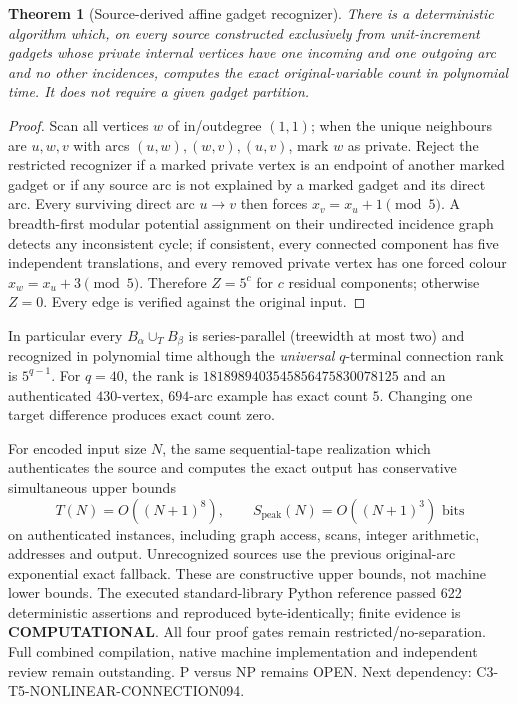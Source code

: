 \documentclass[11pt]{article}
\newtheorem{theorem}{Theorem}
\begin{document}
\begin{theorem}[Source-derived affine gadget recognizer]
There is a deterministic algorithm which, on every source
constructed exclusively from unit-increment gadgets whose
private internal vertices have one incoming and one outgoing
arc and no other incidences, computes the \emph{exact}
original-variable count in polynomial time. It does not
require a given gadget partition.
\end{theorem}
\begin{proof}
Scan all vertices $w$ of in/outdegree $(1,1)$; when the unique
neighbours are $u,w,v$ with arcs $(u,w),(w,v),(u,v)$,
mark $w$ as private. Reject the restricted recognizer if
a marked private vertex is an endpoint of another marked
gadget or if any source arc is not explained by a marked
gadget and its direct arc. Every surviving direct arc
$u\to v$ then forces $x_v=x_u+1\pmod5$.
A breadth-first modular potential assignment on their
undirected incidence graph detects any inconsistent cycle;
if consistent, every connected component has five independent
translations, and every removed private vertex has one
forced colour $x_w=x_u+3\pmod5$. Therefore $Z=5^c$
for $c$ residual components; otherwise $Z=0$.
Every edge is verified against the original input.
\end{proof}
In particular every $B_\alpha\cup_T B_\beta$ is
series-parallel (treewidth at most two) and recognized in
polynomial time although the \emph{universal} $q$-terminal
connection rank is $5^{q-1}$. For $q=40$, the rank is
$1818989403545856475830078125$ and an authenticated
$430$-vertex, $694$-arc example has exact count $5$.
Changing one target difference produces exact count zero.

For encoded input size $N$, the same sequential-tape realization
which authenticates the source and computes the exact output has
conservative simultaneous upper bounds
\[
T(N)=O((N+1)^8),\qquad
S_{\mathrm{peak}}(N)=O((N+1)^3)\text{ bits}
\]
on authenticated instances, including graph access, scans, integer
arithmetic, addresses and output. Unrecognized sources use the
previous original-arc exponential exact fallback. These are
constructive upper bounds, not machine lower bounds.
The executed standard-library Python reference passed 622
deterministic assertions and reproduced byte-identically;
finite evidence is \textbf{COMPUTATIONAL}.
All four proof gates remain restricted/no-separation.
Full combined compilation, native machine implementation and
independent review remain outstanding. P versus NP remains OPEN.
Next dependency: C3-T5-NONLINEAR-CONNECTION094.
\end{document}
